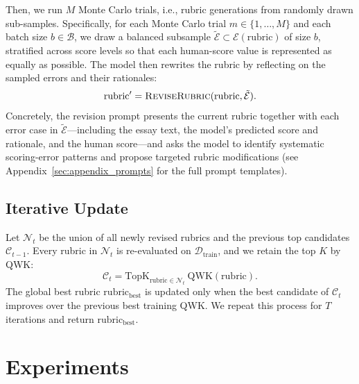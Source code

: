 \documentclass[11pt]{article}
\newcommand{\procname}[1]{\textsc{#1}}
\newcommand{\rubric}{\mathrm{rubric}}
\begin{document}
Then, we run $M$ Monte Carlo trials, i.e., rubric generations from randomly drawn sub-samples.
Specifically, for each Monte Carlo trial \(m\in\{1,\dots,M\}\) and each batch size \(b \in \mathcal{B}\), we draw a balanced subsample \(\tilde{\mathcal{E}} \subset \mathcal{E}(\rubric)\) of size \(b\), stratified across score levels so that each human-score value is represented as equally as possible. The model then rewrites the rubric by reflecting on the sampled errors and their rationales:
\begin{equation}
\rubric' = \procname{ReviseRubric}(\rubric, \tilde{\mathcal{E}}).
\end{equation}
Concretely, the revision prompt presents the current rubric together with each error case in \(\tilde{\mathcal{E}}\)---including the essay text, the model's predicted score and rationale, and the human score---and asks the model to identify systematic scoring-error patterns and propose targeted rubric modifications (see Appendix~\ref{sec:appendix_prompts} for the full prompt templates).

\subsection{Iterative Update}
Let \(\mathcal{N}_t\) be the union of all newly revised rubrics and the previous top candidates \(\mathcal{C}_{t-1}\). Every rubric in \(\mathcal{N}_t\) is re-evaluated on \(\mathcal{D}_{\mathrm{train}}\), and we retain the top \(K\) by QWK:
\begin{equation}
\mathcal{C}_t=\mathrm{TopK}_{\rubric\in\mathcal{N}_t}\ \mathrm{QWK}(\rubric).
\end{equation}
The global best rubric \(\rubric_{\mathrm{best}}\) is updated only when the best candidate of \(\mathcal{C}_t\) improves over the previous best training QWK. We repeat this process for \(T\) iterations and return \(\rubric_{\mathrm{best}}\).

\section{Experiments}
\label{sec:experiments}
\end{document}
